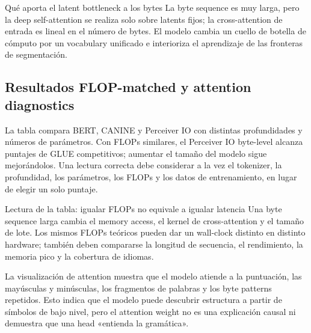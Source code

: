 \begin{importantbox}{Qué aporta el latent bottleneck a los bytes}
La byte sequence es muy larga, pero la deep self-attention se realiza solo sobre latents fijos; la cross-attention de entrada es lineal en el número de bytes. El modelo cambia un cuello de botella de cómputo por un vocabulary unificado e interioriza el aprendizaje de las fronteras de segmentación.
\end{importantbox}

\subsection{Resultados FLOP-matched y attention diagnostics}

La tabla compara BERT, CANINE y Perceiver IO con distintas profundidades y números de parámetros. Con FLOPs similares, el Perceiver IO byte-level alcanza puntajes de GLUE competitivos; aumentar el tamaño del modelo sigue mejorándolos. Una lectura correcta debe considerar a la vez el tokenizer, la profundidad, los parámetros, los FLOPs y los datos de entrenamiento, en lugar de elegir un solo puntaje.


\begin{knowledgebox}{Lectura de la tabla: igualar FLOPs no equivale a igualar latencia}
Una byte sequence larga cambia el memory access, el kernel de cross-attention y el tamaño de lote. Los mismos FLOPs teóricos pueden dar un wall-clock distinto en distinto hardware; también deben compararse la longitud de secuencia, el rendimiento, la memoria pico y la cobertura de idiomas.
\end{knowledgebox}

La visualización de attention muestra que el modelo atiende a la puntuación, las mayúsculas y minúsculas, los fragmentos de palabras y los byte patterns repetidos. Esto indica que el modelo puede descubrir estructura a partir de símbolos de bajo nivel, pero el attention weight no es una explicación causal ni demuestra que una head «entienda la gramática».


